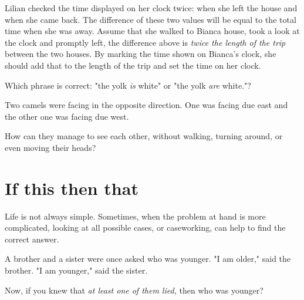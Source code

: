 \documentclass{article}
\begin{document}
\begin{soln} 
    Lilian checked the time displayed on her clock twice: when she left the house and when she came back.
    The difference of these two values will be equal to the total time when she was away.
    Assume that she walked to Bianca house, took a look at the clock and promptly left,
    the difference above is \textit{twice the length of the trip} between the two houses.
    By marking the time shown on Bianca's clock,
    she should add that to the length of the trip and set the time on her clock.
\end{soln}

\begin{exercise*}
    \label{exercise:pi-2022-4-p4}
    Which phrase is correct: "the yolk \textit{is} white" or "the yolk \textit{are} white."?
\end{exercise*}

\begin{exercise*}
    \label{exercise:pi-2022-4-p5}
    Two camels were facing in the opposite direction.
    One was facing due east and the other one was facing due west.

    How can they manage to see each other, without walking, turning around, or even moving their heads?
\end{exercise*}

\section*{If this then that}

Life is not always simple. Sometimes, when the problem at hand is more complicated, 
looking at all possible cases, or caseworking, can help to find the correct answer.

\begin{example*}
    \label{example:pi-2022-4-p6}
    A brother and a sister were once asked who was younger. "I am older," said the brother.
    "I am younger," said the sister.

    Now, if you knew that \textit{at least one of them lied,}
    then who was younger?
\end{example*}
\end{document}
